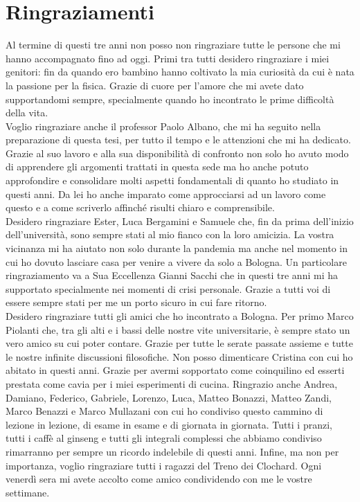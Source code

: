 
\chapter*{Ringraziamenti}
Al termine di questi tre anni non posso non ringraziare tutte le persone che mi hanno accompagnato fino ad oggi. Primi tra tutti desidero ringraziare i miei genitori: fin da quando ero bambino hanno coltivato la mia curiosità da cui è nata la passione per la fisica. Grazie di cuore per l'amore che mi avete dato supportandomi sempre, specialmente quando ho incontrato le prime difficoltà della vita.\\Voglio ringraziare anche il professor Paolo Albano, che mi ha seguito nella preparazione di questa tesi, per tutto il tempo e le attenzioni che mi ha dedicato. Grazie al suo lavoro e alla sua disponibilità di confronto non solo ho avuto modo di apprendere gli argomenti trattati in questa sede ma ho anche potuto approfondire e consolidare molti aspetti fondamentali di quanto ho studiato in questi anni. Da lei ho anche imparato come approcciarsi ad un lavoro come questo e a come scriverlo affinché risulti chiaro e comprensibile.\\ Desidero ringraziare Ester, Luca Bergamini e Samuele che, fin da prima dell'inizio dell'università, sono sempre stati al mio fianco con la loro amicizia. La vostra vicinanza mi ha aiutato non solo durante la pandemia ma anche nel momento in cui ho dovuto lasciare casa per venire a vivere da solo a Bologna. Un particolare ringraziamento va a Sua Eccellenza Gianni Sacchi che in questi tre anni mi ha supportato specialmente nei momenti di crisi personale. Grazie a tutti voi di essere sempre stati per me un porto sicuro in cui fare ritorno.\\Desidero ringraziare tutti gli amici che ho incontrato a Bologna. Per primo Marco Piolanti che, tra gli alti e i bassi delle nostre vite universitarie, è sempre stato un vero amico su cui poter contare. Grazie per tutte le serate passate assieme e tutte le nostre infinite discussioni filosofiche. Non posso dimenticare Cristina con cui ho abitato in questi anni. Grazie per avermi sopportato come coinquilino ed esserti prestata come cavia per i miei esperimenti di cucina. Ringrazio anche Andrea, Damiano, Federico, Gabriele, Lorenzo, Luca, Matteo Bonazzi, Matteo Zandi, Marco Benazzi e Marco Mullazani con cui ho condiviso questo cammino di lezione in lezione, di esame in esame e di giornata in giornata. Tutti i pranzi, tutti i caffè al ginseng e tutti gli integrali complessi che abbiamo condiviso rimarranno per sempre un ricordo indelebile di questi anni. Infine, ma non per importanza, voglio ringraziare tutti i ragazzi del Treno dei Clochard. Ogni venerdì sera mi avete accolto come amico condividendo con me le vostre settimane. 
